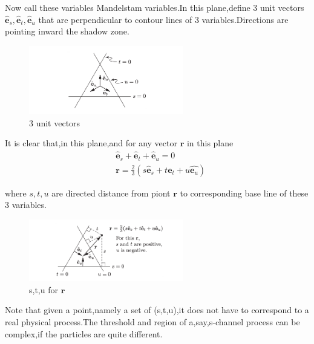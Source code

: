 \documentclass[a4paper]{article}
\begin{document}
Now call these variables Mandelstam variables.In this plane,define 3 unit vectors $\hat{\bm{e}}_s,\hat{\bm{e}}_t,\hat{\bm{e}}_u$ that are perpendicular to contour lines of 3 variables.Directions are pointing inward the shadow zone.
\begin{figure}[htbp]
	\centering
	\includegraphics[width=0.6\textwidth]{13.png}
	\caption{3 unit vectors}
\end{figure}
\vspace{0.05\textheight}
\par It is clear that,in this plane,and for any vector $\bm{r}$ in this plane
\vspace{0.05\textheight}
\begin{align*}
	&\hat{\bm{e}}_s+\hat{\bm{e}}_t+\hat{\bm{e}}_u=0\\
	&\bm{r}=\frac{2}{3}(s\hat{\bm{e}}_s+t\hat{\bm{e}_t}+u\hat{\bm{e}_u})
\end{align*}

\vspace{0.1\textheight}
where $s,t,u$ are directed distance from piont $\bm{r}$ to corresponding base line of these 3 variables.
\begin{figure}[htbp]
	\centering
	\includegraphics[width=0.6\textwidth]{14.png}
	\caption{s,t,u for $\bm{r}$}
\end{figure}

Note that given a point,namely a set of (s,t,u),it does not have to correspond to a real physical process.The threshold and region of a,say,s-channel process can be complex,if the particles are quite different.
\end{document}
